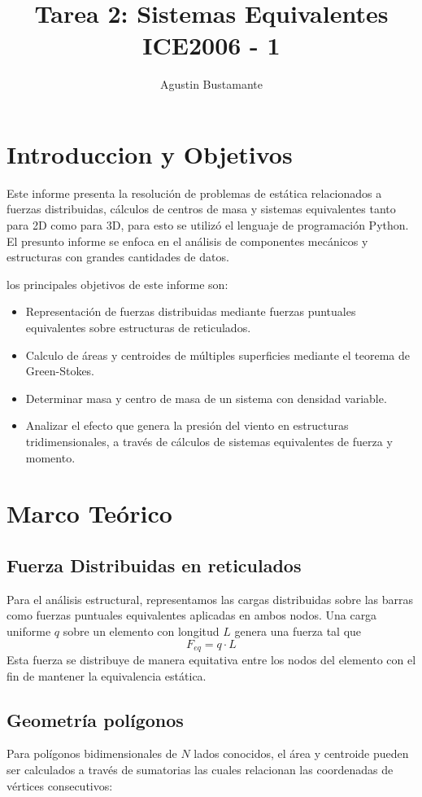 \documentclass[]{article}
\title{Tarea 2: Sistemas Equivalentes \\ [0.5em] \large ICE2006 - 1}
\author{Agustin Bustamante}
\begin{document}
\maketitle

\newpage

\section{Introduccion y Objetivos}
Este informe presenta la resolución de problemas de estática relacionados a fuerzas distribuidas, cálculos de centros de masa y sistemas equivalentes tanto para 2D como para 3D, para esto se utilizó el lenguaje de programación Python. El presunto informe se enfoca en el análisis de componentes mecánicos y estructuras con grandes cantidades de datos.

los principales objetivos de este informe son:
\begin{itemize}
	\item Representación de fuerzas distribuidas mediante fuerzas puntuales equivalentes sobre estructuras de reticulados.
	\item Calculo de áreas y centroides de múltiples superficies mediante el teorema de Green-Stokes.
	\item Determinar masa y centro de masa de un sistema con densidad variable.
	\item Analizar el efecto que genera la presión del viento en estructuras tridimensionales, a través de cálculos de sistemas equivalentes de fuerza y momento.
\end{itemize}

\section{Marco Teórico}
\subsection{Fuerza Distribuidas en reticulados}
Para el análisis estructural, representamos las cargas distribuidas sobre las barras como fuerzas puntuales equivalentes aplicadas en ambos nodos. Una carga uniforme $q$ sobre un elemento con longitud $L$ genera una fuerza tal que
\begin{equation}
	F_{eq} = q \cdot L
\end{equation}
Esta fuerza se distribuye de manera equitativa entre los nodos del elemento con el fin de mantener la equivalencia estática.

\subsection{Geometría polígonos}
Para polígonos bidimensionales de $N$ lados conocidos, el área y centroide pueden ser calculados a través de sumatorias las cuales relacionan las coordenadas de vértices consecutivos:
\end{document}
